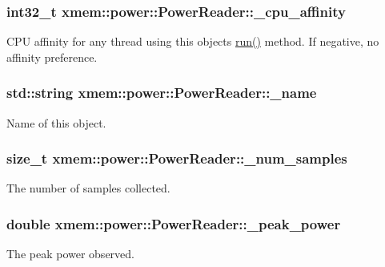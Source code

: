 \subsubsection[{\+\_\+cpu\+\_\+affinity}]{\setlength{\rightskip}{0pt plus 5cm}int32\+\_\+t xmem\+::power\+::\+Power\+Reader\+::\+\_\+cpu\+\_\+affinity\hspace{0.3cm}{\ttfamily [protected]}}\label{classxmem_1_1power_1_1_power_reader_a0f95e6c4e8caa6db8de3fcf78509e887}
C\+P\+U affinity for any thread using this object\textquotesingle{}s \hyperlink{classxmem_1_1power_1_1_power_reader_ad8286b3727efbcb0ff5049c6594d126a}{run()} method. If negative, no affinity preference. \hypertarget{classxmem_1_1power_1_1_power_reader_a85791da354d03c0a0f7ca4cf38b89e4c}{}
\subsubsection[{\+\_\+name}]{\setlength{\rightskip}{0pt plus 5cm}std\+::string xmem\+::power\+::\+Power\+Reader\+::\+\_\+name\hspace{0.3cm}{\ttfamily [protected]}}\label{classxmem_1_1power_1_1_power_reader_a85791da354d03c0a0f7ca4cf38b89e4c}
Name of this object. \hypertarget{classxmem_1_1power_1_1_power_reader_a296a8d15083e01e33590cbcd836aa07b}{}
\subsubsection[{\+\_\+num\+\_\+samples}]{\setlength{\rightskip}{0pt plus 5cm}size\+\_\+t xmem\+::power\+::\+Power\+Reader\+::\+\_\+num\+\_\+samples\hspace{0.3cm}{\ttfamily [protected]}}\label{classxmem_1_1power_1_1_power_reader_a296a8d15083e01e33590cbcd836aa07b}
The number of samples collected. \hypertarget{classxmem_1_1power_1_1_power_reader_a0bfe4f56c143f3febb404d85558e45fa}{}
\subsubsection[{\+\_\+peak\+\_\+power}]{\setlength{\rightskip}{0pt plus 5cm}double xmem\+::power\+::\+Power\+Reader\+::\+\_\+peak\+\_\+power\hspace{0.3cm}{\ttfamily [protected]}}\label{classxmem_1_1power_1_1_power_reader_a0bfe4f56c143f3febb404d85558e45fa}
The peak power observed. \hypertarget{classxmem_1_1power_1_1_power_reader_ac8ad4bada42912ece1cbb0769dbe3b4d}{}
